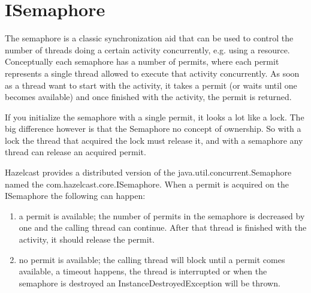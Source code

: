 \section{ISemaphore}
The semaphore is a classic synchronization aid that can be used to control the number of threads doing a certain activity concurrently, e.g. using a resource. Conceptually each semaphore has a number of permits, where each permit represents a single thread allowed to execute that activity concurrently. As soon as a thread want to start with the activity, it takes a permit (or waits until one becomes available) and once finished with the activity, the permit is returned.

If you initialize the semaphore with a single permit, it looks a lot like a lock. The big difference however is that the Semaphore no concept of ownership. So with a lock the thread that acquired the lock must release it, and with a semaphore any thread can release an acquired permit.

Hazelcast provides a distributed version of the java.util.concurrent.Semaphore named the com.hazelcast.core.ISemaphore. When a permit is acquired on the ISemaphore the following can happen:
\begin{enumerate}
\item a permit is available; the number of permits in the semaphore is decreased by one and the calling thread can continue. After that thread is finished with the activity, it should release the permit.
\item no permit is available; the calling thread will block until a permit comes available, a timeout happens, the thread is interrupted or when the semaphore is destroyed an InstanceDestroyedException will be thrown.
\end{enumerate}

